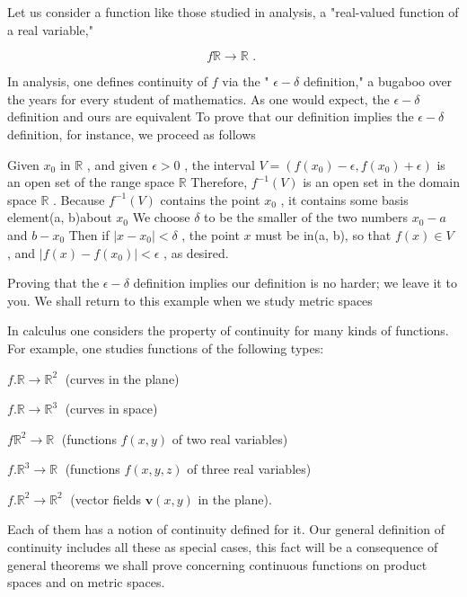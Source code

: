 \begin{example} Let us consider a function like those studied in analysis, a "real-valued function of a real variable,"

\[
f\mathbb{R} \rightarrow  \mathbb{R}\text{ . }
\]

In analysis, one defines continuity of \(f\) via the " \(\epsilon  - \delta\) definition," a bugaboo over the years for every student of mathematics. As one would expect, the \(\epsilon  - \delta\) definition and ours are equivalent To prove that our definition implies the \(\epsilon  - \delta\) definition, for instance, we proceed as follows

Given \({x}_{0}\) in \(\mathbb{R}\) , and given \(\epsilon  > 0\) , the interval \(V = \left( {f\left( {x}_{0}\right)  - \epsilon ,f\left( {x}_{0}\right)  + \epsilon }\right)\) is an open set of the range space \(\mathbb{R}\) Therefore, \({f}^{-1}\left( V\right)\) is an open set in the domain space \(\mathbb{R}\) . Because \({f}^{-1}\left( V\right)\) contains the point \({x}_{0}\) , it contains some basis element(a, b)about \({x}_{0}\) We choose \(\delta\) to be the smaller of the two numbers \({x}_{0} - a\) and \(b - {x}_{0}\) Then if \(\left| {x - {x}_{0}}\right|  < \delta\) , the point \(x\) must be in(a, b), so that \(f\left( x\right)  \in  V\) , and \(\left| {f\left( x\right)  - f\left( {x}_{0}\right) }\right|  < \epsilon\) , as desired.

Proving that the \(\epsilon  - \delta\) definition implies our definition is no harder; we leave it to you. We shall return to this example when we study metric spaces
\end{example}

\begin{example} In calculus one considers the property of continuity for many kinds of functions. For example, one studies functions of the following types:

\(f.\mathbb{R} \rightarrow  {\mathbb{R}}^{2}\;\) (curves in the plane)

\(f.\mathbb{R} \rightarrow  {\mathbb{R}}^{3}\;\) (curves in space)

\(f{\mathbb{R}}^{2} \rightarrow  \mathbb{R}\;\) (functions \(f\left( {x,y}\right)\) of two real variables)

\(f.{\mathbb{R}}^{3} \rightarrow  \mathbb{R}\;\) (functions \(f\left( {x,y,z}\right)\) of three real variables)

\(f.{\mathbb{R}}^{2} \rightarrow  {\mathbb{R}}^{2}\;\) (vector fields \(\mathbf{v}\left( {x,y}\right)\) in the plane).

Each of them has a notion of continuity defined for it. Our general definition of continuity includes all these as special cases, this fact will be a consequence of general theorems we shall prove concerning continuous functions on product spaces and on metric spaces.
\end{example}

